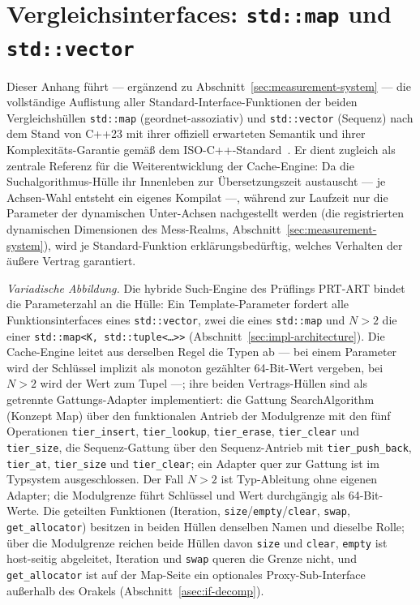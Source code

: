 \chapter{Vergleichsinterfaces: \texttt{std::map} und \texttt{std::vector}}\label{app:interfaces}

Dieser Anhang führt --- ergänzend zu Abschnitt~\ref{sec:measurement-system} --- die vollständige
Auflistung aller Standard-Interface-Funktionen der beiden Vergleichshüllen \texttt{std::map}
(geordnet-assoziativ) und \texttt{std::vector} (Sequenz) nach dem Stand von C++23 mit ihrer
offiziell erwarteten Semantik und ihrer Komplexitäts-Garantie gemäß dem
ISO-C++-Standard~\cite{iso_cpp}. Er dient zugleich als zentrale Referenz für die Weiterentwicklung
der Cache-Engine: Da die Suchalgorithmus-Hülle ihr Innenleben zur Übersetzungszeit austauscht ---
je Achsen-Wahl entsteht ein eigenes Kompilat ---, während zur Laufzeit nur die Parameter der
dynamischen Unter-Achsen nachgestellt werden (die registrierten dynamischen Dimensionen des
Mess-Realms, Abschnitt~\ref{sec:measurement-system}), wird je Standard-Funktion
erklärungsbedürftig, welches Verhalten der äußere Vertrag garantiert.

\emph{Variadische Abbildung.} Die hybride Such-Engine des Prüflings PRT-ART bindet die
Parameterzahl an die Hülle: Ein Template-Parameter fordert alle Funktionsinterfaces eines
\texttt{std::vector}, zwei die eines \texttt{std::map} und $N>2$ die einer
\texttt{std::map<K,\,std::tuple<\ldots>>} (Abschnitt~\ref{sec:impl-architecture}). Die Cache-Engine
leitet aus derselben Regel die Typen ab --- bei einem Parameter wird der Schlüssel implizit als
monoton gezählter 64-Bit-Wert vergeben, bei $N>2$ wird der Wert zum Tupel ---; ihre beiden
Vertrags-Hüllen sind als getrennte Gattungs-Adapter implementiert: die Gattung SearchAlgorithm (Konzept
Map) über den funktionalen
Antrieb der Modulgrenze mit den fünf Operationen \texttt{tier\_insert}, \texttt{tier\_lookup},
\texttt{tier\_erase}, \texttt{tier\_clear} und \texttt{tier\_size}, die Sequenz-Gattung über den
Sequenz-Antrieb mit \texttt{tier\_push\_back}, \texttt{tier\_at}, \texttt{tier\_size} und
\texttt{tier\_clear}; ein Adapter quer zur Gattung ist im Typsystem ausgeschlossen. Der Fall $N>2$
ist Typ-Ableitung ohne eigenen Adapter; die Modulgrenze führt Schlüssel und Wert durchgängig als
64-Bit-Werte. Die geteilten Funktionen (Iteration, \texttt{size}/\texttt{empty}/\texttt{clear},
\texttt{swap}, \texttt{get\_allocator}) besitzen in beiden Hüllen denselben Namen und dieselbe Rolle;
über die Modulgrenze reichen beide Hüllen davon \texttt{size} und \texttt{clear}, \texttt{empty} ist
host-seitig abgeleitet, Iteration und \texttt{swap} queren die Grenze nicht, und
\texttt{get\_allocator} ist auf der Map-Seite ein optionales Proxy-Sub-Interface außerhalb des
Orakels (Abschnitt~\ref{asec:if-decomp}).

